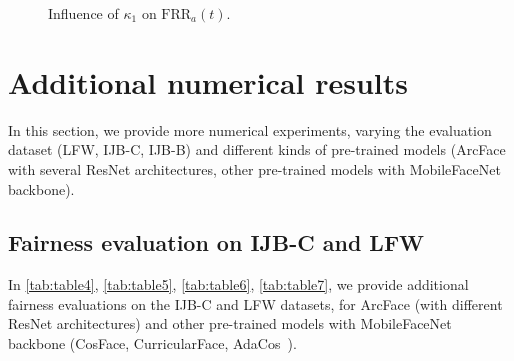 \documentclass[nohyperref]{article}
\theoremstyle{plain}
\theoremstyle{definition}
\theoremstyle{remark}
\begin{document}
\begin{figure}[h]
    \centering
     \hspace{2cm}
   \caption{Influence of $\kappa_1$ on $\mathrm{FRR}_a(t)$.}    \label{fig:kappa_f_influence_FRR_a(t)}
\end{figure}

\clearpage

\section{Additional numerical results}\label{app:additional_results}

In this section, we provide more numerical experiments, varying the evaluation dataset (LFW, IJB-C, IJB-B) and different kinds of pre-trained models (ArcFace with several ResNet architectures, other pre-trained models with MobileFaceNet backbone).



\subsection{Fairness evaluation on IJB-C and LFW}

In \autoref{tab:table4}, \autoref{tab:table5}, \autoref{tab:table6}, \autoref{tab:table7}, we provide additional fairness evaluations on the IJB-C and LFW datasets, for ArcFace (with different ResNet architectures) and other pre-trained models with MobileFaceNet backbone (CosFace, CurricularFace, AdaCos~\cite{adacos}).
\end{document}
